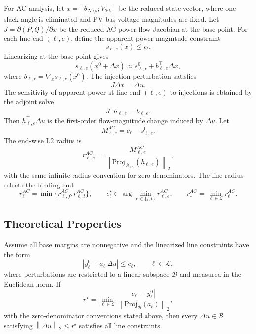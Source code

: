 \documentclass[energies,article,submit,pdftex,moreauthors]{Definitions/mdpi}
\newcommand{\norm}[1]{\left\lVert #1 \right\rVert}
\newcommand{\abs}[1]{\left\lvert #1 \right\rvert}
\newcommand{\Proj}{\mathrm{Proj}}
\begin{document}
For AC analysis, let $x=[\theta_{\mathcal{N}\setminus s};V_{\mathcal{PQ}}]$ be the reduced state vector, where one slack angle is eliminated and PV bus voltage magnitudes are fixed. Let $J=\partial(P,Q)/\partial x$ be the reduced AC power-flow Jacobian at the base point. For each line end $(\ell,e)$, define the apparent-power magnitude constraint
\begin{equation}
  s_{\ell,e}(x) \le c_\ell.
\end{equation}
Linearizing at the base point gives
\begin{equation}
  s_{\ell,e}(x^0+\Delta x)
  \approx
  s^0_{\ell,e}
  +
  b_{\ell,e}^\top \Delta x,
\end{equation}
where $b_{\ell,e}=\nabla_x s_{\ell,e}(x^0)$. The injection perturbation satisfies
\begin{equation}
  J\Delta x=\Delta u.
\end{equation}
The sensitivity of apparent power at line end $(\ell,e)$ to injections is obtained by the adjoint solve
\begin{equation}
  J^\top h_{\ell,e}=b_{\ell,e}.
\end{equation}
Then $h_{\ell,e}^\top \Delta u$ is the first-order flow-magnitude change induced by $\Delta u$. Let
\begin{equation}
  M_{\ell,e}^{AC}=c_\ell-s^0_{\ell,e}.
\end{equation}
The end-wise L2 radius is
\begin{equation}
  r_{\ell,e}^{AC} = \frac{M_{\ell,e}^{AC}}{\norm{\Proj_{\mathcal{B}_{AC}}(h_{\ell,e})}_2},
\end{equation}
with the same infinite-radius convention for zero denominators. The line radius selects the binding end:
\begin{equation}
  r_\ell^{AC}=\min\{r_{\ell,f}^{AC},r_{\ell,t}^{AC}\},
  \qquad
  e_\ell^\star\in\arg\min_{e\in\{f,t\}}r_{\ell,e}^{AC},
  \qquad
  r_\star^{AC}=\min_{\ell\in\mathcal{L}}r_\ell^{AC}.
\end{equation}

\subsection{Theoretical Properties}

\begin{Theorem}
\label{thm:soundness}
Assume all base margins are nonnegative and the linearized line constraints have the form
\begin{equation}
  \abs{y_\ell^0 + a_\ell^\top\Delta u}\le c_\ell,
  \qquad \ell\in\mathcal{L},
\end{equation}
where perturbations are restricted to a linear subspace $\mathcal{B}$ and measured in the Euclidean norm. If
\begin{equation}
  r^\star = \min_{\ell\in\mathcal{L}}
  \frac{c_\ell-\abs{y_\ell^0}}{\norm{\Proj_{\mathcal{B}}(a_\ell)}_2},
\end{equation}
with the zero-denominator conventions stated above, then every $\Delta u\in\mathcal{B}$ satisfying $\norm{\Delta u}_2\le r^\star$ satisfies all line constraints.
\end{Theorem}
\end{document}

